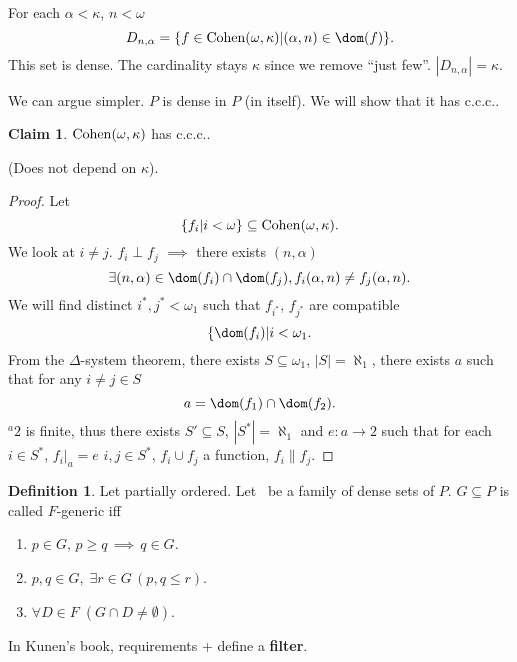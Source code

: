 \documentclass[11pt,pdftex,twoside,a4paper]{article}
\newcommand{\B}[1]{\textbf{#1}}
\newcommand{\Cohen}{\mathop{\rm Cohen}\nolimits}
\newcommand{\ccc}{c.c.c.}
\theoremstyle{definition}
\newtheorem{ldef}[thm]{Definition}
\newtheorem{claim}[thm]{Claim}
\begin{document}
For each \(\alpha < \kappa\), \(n < \omega\)
\begin{equation*}
D_{n,\alpha} = \{f\in \Cohen(\omega,\kappa)| (\alpha,n)\in\dom(f)\}.
\end{equation*}
This set is dense. The cardinality stays \(\kappa\)
since we remove ``just few''.
\(|D_{n,\alpha}|=\kappa\).

We can argue simpler. $P$ is dense in $P$ (in itself).
We will show that it has \ccc.

\begin{claim}
\(\Cohen(\omega,\kappa)\) has \ccc.
\end{claim}
(Does not depend on \(\kappa\)).
\begin{proof}
Let
\begin{equation*}
\{f_i| i < \omega\} \subseteq \Cohen(\omega,\kappa).
\end{equation*}
We look at \(i\neq j\).
\(f_i \perp f_j\)  \(\implies\) there exists \((n,\alpha)\)
\begin{equation*}
\exists(n,\alpha) \in \dom(f_i)\cap\dom(f_j), f_i(\alpha,n) \neq f_j(\alpha,n).
\end{equation*}
We will find distinct \(i^*,j^* < \omega_1\) such that
\(f_{i^*}\), \(f_{j^*}\) are compatible
\begin{equation*}
\{\dom(f_i) | i < \omega_1.
\end{equation*}
From the \(\Delta\)-system theorem, there exists \(S\subseteq \omega_1\),
\(|S|=\aleph_1\), there exists $a$ such that for any \(i\neq j\in S\)
\begin{equation*}
a = \dom(f_1) \cap \dom(f_2).
\end{equation*}
\({}^a 2\) is finite, thus there exists \(S'\subseteq S\), \(|S^*| = \aleph_1\)
and \(e: a\to 2\) such that for each \(i\in S^*\), \(f_i|_a = e\)
\(i,j\in S^*\), \(f_i \cup f_j\) a function, \(f_i\| f_j\).
\end{proof}

\begin{ldef}
Let  partially ordered.
Let \scrF\ be a family of dense sets of $P$. \(G\subseteq P\)
is called $F$-generic iff
\begin{enumerate}
\item \(p\in G,\,p \geq q\,\implies\, q\in G\).
\item \(p,q\in G,\; \exists r\in G\, (p,q \leq r)\).
\item \(\forall D\in F\; (G\cap D\neq \emptyset)\).
\end{enumerate}
\end{ldef}
In Kunen's book, requirements + define a \B{filter}.
\end{document}
